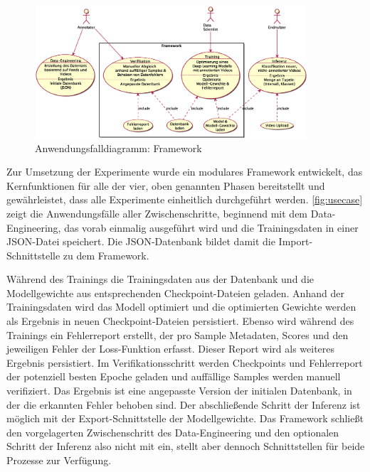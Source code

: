 \begin{figure}[htbp!]
    \centering
    \includegraphics[width=0.9\textwidth, height=0.8\textwidth, keepaspectratio, interpolate]{fig/usecase.eps}
    \caption{Anwendungsfalldiagramm: Framework}
    \label{fig:usecase}
\end{figure}

Zur Umsetzung der Experimente wurde ein modulares Framework entwickelt, das Kernfunktionen für alle der vier, oben genannten Phasen bereitstellt und gewährleistet, dass alle Experimente einheitlich durchgeführt werden.
\autoref{fig:usecase} zeigt die Anwendungsfälle aller Zwischenschritte, beginnend mit dem Data-Engineering, das vorab einmalig ausgeführt wird und die Trainingsdaten in einer JSON-Datei speichert.
Die JSON-Datenbank bildet damit die Import-Schnittstelle zu dem Framework.

Während des Trainings die Trainingsdaten aus der Datenbank und die Modellgewichte aus entsprechenden Checkpoint-Dateien geladen.
Anhand der Trainingsdaten wird das Modell optimiert und die optimierten Gewichte werden als Ergebnis in neuen Checkpoint-Dateien persistiert.
Ebenso wird während des Trainings ein Fehlerreport erstellt, der pro Sample Metadaten, Scores und den jeweiligen Fehler der Loss-Funktion erfasst.
Dieser Report wird als weiteres Ergebnis persistiert.
Im Verifikationsschritt werden Checkpoints und Fehlerreport der potenziell besten Epoche geladen und auffällige Samples werden manuell verifiziert.
Das Ergebnis ist eine angepasste Version der initialen Datenbank, in der die erkannten Fehler behoben sind.
Der abschließende Schritt der Inferenz ist möglich mit der Export-Schnittstelle der Modellgewichte.
Das Framework schließt den vorgelagerten Zwischenschritt des Data-Engineering und den optionalen Schritt der Inferenz also nicht mit ein, stellt aber dennoch Schnittstellen für beide Prozesse zur Verfügung.


